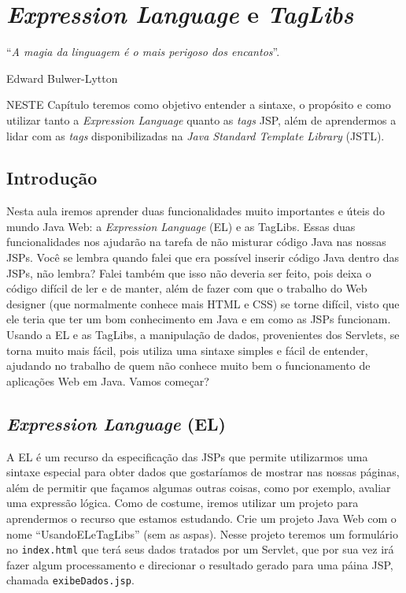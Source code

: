 \chapter{\textit{Expression Language} e \textit{TagLibs}}
\epigraph{``\textit{A magia da linguagem é o mais perigoso dos encantos}''.}{Edward Bulwer-Lytton}

\lettrine[lines=4, lhang=0.1, lraise=0, loversize=0.2, findent=0.1em]{\textcolor{corAzulTema}{N}}{ESTE} Capítulo teremos como objetivo entender a sintaxe, o propósito e como utilizar tanto a \textit{Expression Language} quanto as \textit{tags} JSP, além de aprendermos a lidar com as \textit{tags} disponibilizadas na \textit{Java Standard Template Library} (JSTL).


\section{Introdução}

Nesta aula iremos aprender duas funcionalidades muito importantes e úteis do mundo Java Web: a \textit{Expression Language} (EL) e as TagLibs. Essas duas funcionalidades nos ajudarão na tarefa de não misturar código Java nas nossas JSPs. Você se lembra quando falei que era possível inserir código Java dentro das JSPs, não lembra? Falei também que isso não deveria ser feito, pois deixa o código difícil de ler e de manter, além de fazer com que o trabalho do Web designer (que normalmente conhece mais HTML e CSS) se torne difícil, visto que ele teria que ter um bom conhecimento em Java e em como as JSPs funcionam. Usando a EL e as TagLibs, a manipulação de dados, provenientes dos Servlets, se torna muito mais fácil, pois utiliza uma sintaxe simples e fácil de entender, ajudando no trabalho de quem não conhece muito bem o funcionamento de aplicações Web em Java. Vamos começar?


\section{\textit{Expression Language} (EL)}

A EL é um recurso da especificação das JSPs que permite utilizarmos uma sintaxe especial para obter dados que gostaríamos de mostrar nas nossas páginas, além de permitir que façamos algumas outras coisas, como por exemplo, avaliar uma expressão lógica. Como de costume, iremos utilizar um projeto para aprendermos o recurso que estamos estudando. Crie um projeto Java Web com o nome ``UsandoELeTagLibs'' (sem as aspas). Nesse projeto teremos um formulário no \texttt{index.html} que terá seus dados tratados por um Servlet, que por sua vez irá fazer algum processamento e direcionar o resultado gerado para uma páina JSP, chamada \texttt{exibeDados.jsp}.

